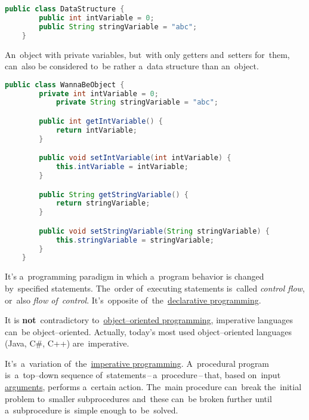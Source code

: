 \begin{lstlisting}[language=Java]
    public class DataStructure {
        public int intVariable = 0;
        public String stringVariable = "abc";
    }
\end{lstlisting}
\newline

\noindent An~object with private variables, but~with only getters and~setters for~them, can~also be considered to~be rather a~data structure than an~object.
\newpage

\begin{lstlisting}[language=Java]
    public class WannaBeObject {
        private int intVariable = 0;
            private String stringVariable = "abc";

        public int getIntVariable() {
            return intVariable;
        }

        public void setIntVariable(int intVariable) {
            this.intVariable = intVariable;
        }

        public String getStringVariable() {
            return stringVariable;
        }

        public void setStringVariable(String stringVariable) {
            this.stringVariable = stringVariable;
        }
    }
\end{lstlisting}

\label{imperativeprogramming}
It's a~programming paradigm in which a~program behavior is changed by~specified statements.
The~order of~executing statements is~called \textit{control flow}, or~also \textit{flow of~control}.
It's~opposite of~the~\hyperref[declarativeprogramming]{declarative programming}.

\warning It is \textbf{not}~contradictory to~\hyperref[objectorientedprogramming]{object--oriented programming}, imperative languages can~be object--oriented.
Actually, today's most used object--oriented languages (Java, C\#, C++) are~imperative.

It's~a~variation of~the~\hyperref[imperativeprogramming]{imperative programming}.
A~procedural program is~a~top--down sequence of~statements\,--\,a~procedure\,--\,that, based on~input \hyperref[parameterargument]{arguments}, performs a~certain action.
The~main procedure can~break the~initial problem to~smaller subprocedures and~these can~be broken further until a~subprocedure is~simple enough to~be~solved.

